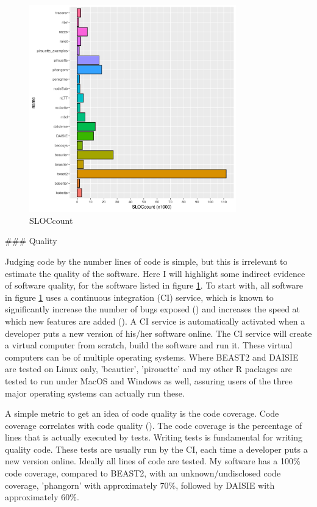 \begin{figure}[H]
  \includegraphics[width=0.8\textwidth]{sloccount.png}
  \caption{
    SLOCcount 
  }
  \label{fig:sloccount}
\end{figure}

### Quality

Judging code by the number lines of code is simple, but this is irrelevant 
to estimate the quality of the software.
Here I will highlight some indirect evidence of software quality,
for the software listed in figure \ref{fig:sloccount}.
To start with, all software in figure \ref{fig:sloccount} uses a
continuous integration (CI) service, which is known to significantly 
increase the number of bugs exposed (\cite{vasilescu2015}) and increases
the speed at which new features are added (\cite{vasilescu2015}).
A CI service is automatically activated when a developer puts a new version of
his/her software online. The CI service will create a virtual computer from
scratch, build the software and run it. These virtual computers can
be of multiple operating systems. 
Where BEAST2 and DAISIE are tested on Linux only, 'beautier',
'pirouette' and my other R packages are tested to run under MacOS and
Windows as well, assuring users of the three major operating systems
can actually run these.

A simple metric to get an idea of code quality is the code coverage.
Code coverage correlates with code quality (\cite{horgan1994,del1995correlation}). 
The code coverage is the percentage of lines
that is actually executed by tests. 
Writing tests is fundamental for writing quality code.
These tests are usually run by the CI, each time a developer puts a new version
online. Ideally all lines of code are tested. 
My software has a 100\% code coverage, compared to BEAST2, with an 
unknown/undisclosed code coverage, 'phangorn' with approximately
70\%, followed by DAISIE with approximately 60\%.

